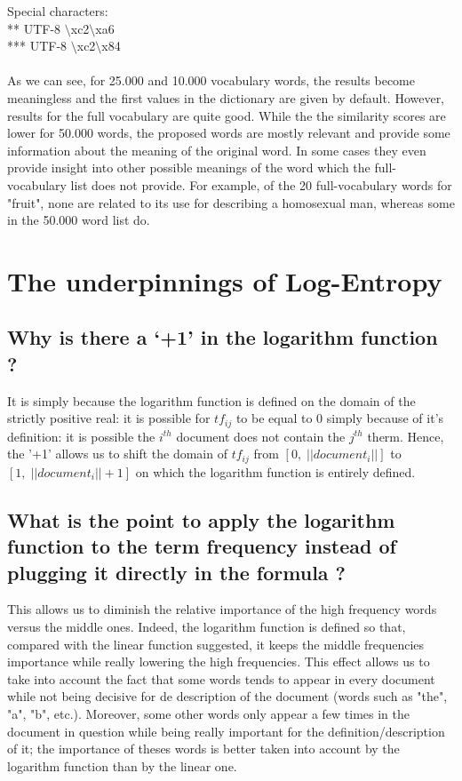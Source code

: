 \documentclass[10pt, a4paper, oneside]{article} %
\begin{document}
Special characters: \\
** UTF-8 $\setminus$xc2$\setminus$xa6 \\ 
*** UTF-8 $\setminus$xc2$\setminus$x84

\paragraph*{}
As we can see, for 25.000 and 10.000 vocabulary words, the results become meaningless and the first values in the dictionary are given by default. However, results for the full vocabulary are quite good. While the the similarity scores are lower for 50.000 words, the proposed words are mostly relevant and provide some information about the meaning of the original word. In some cases they even provide insight into other possible meanings of the word which the full-vocabulary list does not provide. For example, of the 20 full-vocabulary words for "fruit", none are related to its use for describing a homosexual man, whereas some in the 50.000 word list do.



\section{The underpinnings of Log-Entropy}
\subsection{Why is there a ‘+1’ in the logarithm function ?}
It is simply because the logarithm function is defined on the domain of the strictly positive real: it is possible for $tf_{ij}$ to be equal to 0 simply because of it's definition: it is possible the $i^{th}$ document does not contain the $j^{th}$ therm. Hence, the '+1' allows us to shift the domain of $tf_{ij}$ from $[0,\; \vert\vert document_i \vert\vert ]$ to $[1,\; \vert\vert document_i \vert\vert +1 ]$ on which the logarithm function is entirely defined.
\subsection{What is the point to apply the logarithm function to the term frequency instead of plugging it directly in the formula ?}
This allows us to diminish the relative importance of the high frequency words versus the middle ones. Indeed, the logarithm function is defined so that, compared with the linear function suggested, it keeps the middle frequencies importance while really lowering the high frequencies. This effect allows us to take into account the fact that some words tends to appear in every document while not being decisive for de description of the document (words such as "the", "a", "b", etc.). Moreover, some other words only appear a few times in the document in question while being really important for the definition/description of it; the importance of theses words is better taken into account by the logarithm function than by the linear one.
\end{document}
